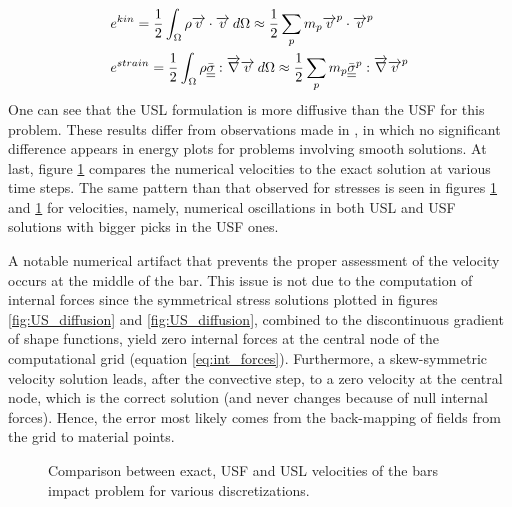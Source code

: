 \begin{align}
  & e^{kin}=\frac{1}{2}\int_\Omega \rho {\overrightarrow{v}}\cdot{\overrightarrow{v}} \:d\Omega \approx \frac{1}{2}\sum_p m_p {\overrightarrow{v}}^p\cdot{\overrightarrow{v}}^p\\
& e^{strain}= \frac{1}{2}\int_\Omega \rho {\underline{\underline{\bar{\sigma}}}}: {\overrightarrow{\nabla}} {\overrightarrow{v}} \:d\Omega \approx \frac{1}{2}\sum_p m_p {\underline{\underline{\bar{\sigma}}}}^p: {\overrightarrow{\nabla}} {\overrightarrow{v}}^p
\end{align}
One can see that the USL formulation is more diffusive than the USF for this problem. These results differ from observations made in \cite{Bardenhagen_USF_USL}, in which no significant difference appears in energy plots for problems involving smooth solutions. At last, figure \ref{fig:US_velocities} compares the numerical velocities to the exact solution at various time steps. The same pattern than that observed for stresses is seen in figures \ref{fig:US_velocities} and \ref{fig:US_velocities} for velocities, namely, numerical oscillations in both USL and USF solutions with bigger picks in the USF ones. 

A notable numerical artifact that prevents the proper assessment of the velocity occurs at the middle of the bar. This issue is not due to the computation of internal forces since the symmetrical stress solutions plotted in figures \ref{fig:US_diffusion} and \ref{fig:US_diffusion}, combined to the discontinuous gradient of shape functions, yield zero internal forces at the central node of the computational grid (equation \eqref{eq:int_forces}). Furthermore, a skew-symmetric velocity solution leads, after the convective step, to a zero velocity at the central node, which is the correct solution (and never changes because of null internal forces). Hence, the error most likely comes from the back-mapping of fields from the grid to material points. 
\begin{figure}[h!]
  \centering
  { \label{subfig:US_velo_10}}
  { \label{subfig:US_velo_25}}
  \caption{Comparison between exact, USF and USL velocities of the bars impact problem for various discretizations.}
  \label{fig:US_velocities}
\end{figure}

